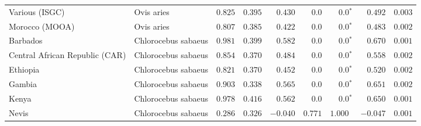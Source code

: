 \begin{center}
\begin{adjustbox}{width = 1\textwidth}
\begin{tabular}{|l|l|r|r|r|r|r|r|r|}
                 Various (ISGC) &           Ovis aries &                                        $ 0.825$ &                                           $ 0.395$ &                      $ 0.430$ &            $0.0$ &                  $\bm{0.0{^*}}$ &                                           $ 0.492$ &           $ 0.003$ \\
                 Morocco (MOOA) &           Ovis aries &                                        $ 0.807$ &                                           $ 0.385$ &                      $ 0.422$ &            $0.0$ &                  $\bm{0.0{^*}}$ &                                           $ 0.483$ &           $ 0.002$ \\
                       Barbados &  Chlorocebus sabaeus &                                        $ 0.981$ &                                           $ 0.399$ &                      $ 0.582$ &            $0.0$ &                  $\bm{0.0{^*}}$ &                                           $ 0.670$ &           $ 0.001$ \\
 Central African Republic (CAR) &  Chlorocebus sabaeus &                                        $ 0.854$ &                                           $ 0.370$ &                      $ 0.484$ &            $0.0$ &                  $\bm{0.0{^*}}$ &                                           $ 0.558$ &           $ 0.002$ \\
                       Ethiopia &  Chlorocebus sabaeus &                                        $ 0.821$ &                                           $ 0.370$ &                      $ 0.452$ &            $0.0$ &                  $\bm{0.0{^*}}$ &                                           $ 0.520$ &           $ 0.002$ \\
                         Gambia &  Chlorocebus sabaeus &                                        $ 0.903$ &                                           $ 0.338$ &                      $ 0.565$ &            $0.0$ &                  $\bm{0.0{^*}}$ &                                           $ 0.651$ &           $ 0.002$ \\
                          Kenya &  Chlorocebus sabaeus &                                        $ 0.978$ &                                           $ 0.416$ &                      $ 0.562$ &            $0.0$ &                  $\bm{0.0{^*}}$ &                                           $ 0.650$ &           $ 0.001$ \\
                          Nevis &  Chlorocebus sabaeus &                                        $ 0.286$ &                                           $ 0.326$ &                      $-0.040$ &         $ 0.771$ &                      $ 1.000~~$ &                                           $-0.047$ &           $ 0.001$ \\

\end{tabular}
\end{adjustbox}
\end{center}
